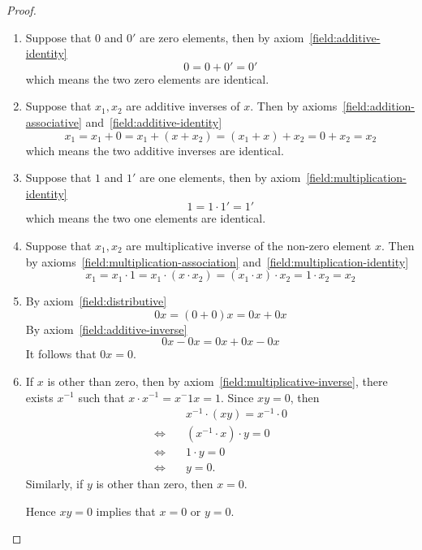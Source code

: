 \begin{proof}
	\begin{enumerate}[label = (\roman*)]
		\item Suppose that $0$ and $0'$ are zero elements, then by axiom~\ref{field:additive-identity}
		      \[
			      0 = 0 + 0' = 0'
		      \]
		      which means the two zero elements are identical.
		\item Suppose that $x_{1}, x_{2}$ are additive inverses of $x$. Then by axioms~\ref{field:addition-associative} and~\ref{field:additive-identity}
		      \[
			      x_{1} = x_{1} + 0 = x_{1} + (x + x_{2}) = (x_{1} + x) + x_{2} = 0 + x_{2} = x_{2}
		      \]
		      which means the two additive inverses are identical.
		\item Suppose that $1$ and $1'$ are one elements, then by axiom~\ref{field:multiplication-identity}
		      \[
			      1 = 1\cdot 1' = 1'
		      \]
		      which means the two one elements are identical.
		\item Suppose that $x_{1}, x_{2}$ are multiplicative inverse of the non-zero element $x$. Then by axioms~\ref{field:multiplication-association} and~\ref{field:multiplication-identity}
		      \[
			      x_{1} = x_{1}\cdot 1 = x_{1}\cdot (x\cdot x_{2}) = (x_{1}\cdot x)\cdot x_{2} = 1\cdot x_{2} = x_{2}
		      \]
		\item By axiom~\ref{field:distributive}
		      \[
			      0x = (0 + 0)x = 0x + 0x
		      \]
		      By axiom~\ref{field:additive-inverse}
		      \[
			      0x - 0x = 0x + 0x - 0x
		      \]
		      It follows that $0x = 0$.
		\item If $x$ is other than zero, then by axiom~\ref{field:multiplicative-inverse}, there exists $x^{-1}$ such that $x\cdot x^{-1} = x{^-1}x = 1$. Since $xy = 0$, then
		      \begin{align*}
			                           & x^{-1}\cdot (xy) = x^{-1}\cdot 0 \\
			      \Leftrightarrow\quad & (x^{-1}\cdot x)\cdot y = 0       \\
			      \Leftrightarrow\quad & 1\cdot y = 0                     \\
			      \Leftrightarrow\quad & y = 0.
		      \end{align*}
		      Similarly, if $y$ is other than zero, then $x = 0$.

		      Hence $xy = 0$ implies that $x = 0$ or $y = 0$.
	\end{enumerate}
\end{proof}

